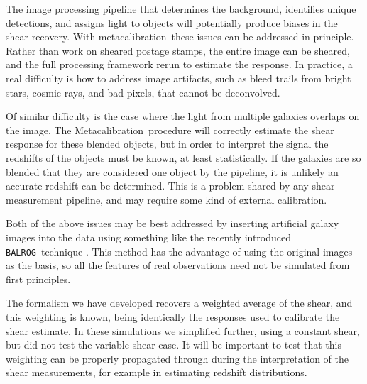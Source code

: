 \documentclass[a4paper,fleqn,usenatbib]{mnras}
\newcommand{\mcal}{metacalibration}
\newcommand{\Mcal}{Metacalibration}
\newcommand{\balrog}{\texttt{BALROG}}
\begin{document}
The image processing pipeline that  determines the background, identifies
unique detections, and assigns light to objects will potentially produce biases
in the shear recovery.  With \mcal\ these issues can be addressed in principle.
Rather than work on sheared postage stamps, the entire image can be sheared,
and the full processing framework rerun to estimate the response.  In practice,
a real difficulty is how to address image artifacts, such as bleed trails from
bright stars, cosmic rays, and bad pixels, that cannot be deconvolved.

Of similar difficulty is the case where the light from multiple galaxies
overlaps on the image.  The \Mcal\ procedure will correctly estimate the shear
response for these blended objects, but in order to interpret the signal the
redshifts of the objects must be known, at least statistically.  If the
galaxies are so blended that they are considered one object by the pipeline, it
is unlikely an accurate redshift can be determined.  This is a problem shared
by any shear measurement pipeline, and may require some kind of external
calibration.

Both of the above issues may be best addressed by inserting artificial galaxy
images into the data using something like the recently introduced \balrog\
technique \citep{Balrog2016}.  This method has the advantage of using the
original images as the basis, so all the features of real observations need not
be simulated from first principles.

The formalism we have developed recovers a weighted average of the shear, and
this weighting is known, being identically the responses used to calibrate the
shear estimate.  In these simulations we simplified further, using a constant
shear, but did not test the variable shear case.  It will be important to
test that this weighting can be properly propagated through during the interpretation
of the shear measurements, for example in estimating redshift distributions.
\end{document}
